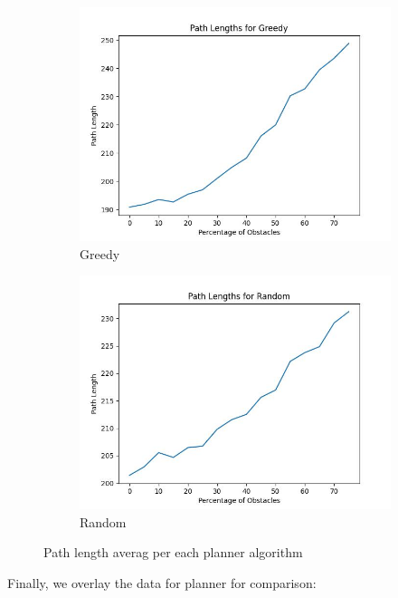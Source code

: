 \documentclass{article}
\begin{document}
\begin{figure}[H]
\begin{subfigure}{0.325\textwidth}
        \includegraphics[width = \textwidth]{plots/Greedy_paths.jpg}
        \caption{Greedy}
    \end{subfigure}
    \begin{subfigure}{0.325\textwidth}
        \centering
        \includegraphics[width = \textwidth]{plots/Random_paths.jpg}
        \caption{Random}
    \end{subfigure}
    \caption{Path length averag per each planner algorithm}
    \label{fig:paths-per-planner}
\end{figure}

Finally, we overlay the data for planner for comparison:
\end{document}

